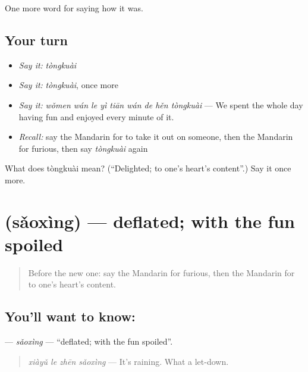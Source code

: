 \begin{grammarlens}[title={What you've built}]
One more word for saying how it was.
\end{grammarlens}

\subsection*{Your turn}
\begin{itemize}
\raggedright
  \item \emph{Say it:} \emph{tòngkuài}
  \item \emph{Say it:} \emph{tòngkuài}, once more
  \item \emph{Say it:} \emph{wǒmen wán le yì tiān wán de hěn tòngkuài} — We spent the whole day having fun and enjoyed every minute of it.
  \item \emph{Recall:} say the Mandarin for to take it out on someone, then the Mandarin for furious, then say \emph{tòngkuài} again
\end{itemize}

\begin{tcolorbox}[breakable,colback=teal!4,colframe=teal!35!black,title={Before you move on}]
What does tòngkuài mean? (\textquotedblleft{}Delighted; to one's heart's content\textquotedblright{}.) Say it once more.
\end{tcolorbox}
\section[\texorpdfstring{\zh{扫兴} (sǎoxìng)}{扫兴 (sǎoxìng)}]{ (sǎoxìng) — deflated; with the fun spoiled}

\label{lesson:ZH-C465-saoxing}



\begin{quote}
Before the new one: say the Mandarin for furious, then the Mandarin for to one's heart's content.
\end{quote}

\subsection*{You'll want to know: }
\textbf{} — \emph{sǎoxìng} — \textquotedblleft{}deflated; with the fun spoiled\textquotedblright{}.

\begin{quote}
\textbf{} \emph{xiàyǔ le zhēn sǎoxìng} — It's raining. What a let-down.
\end{quote}

